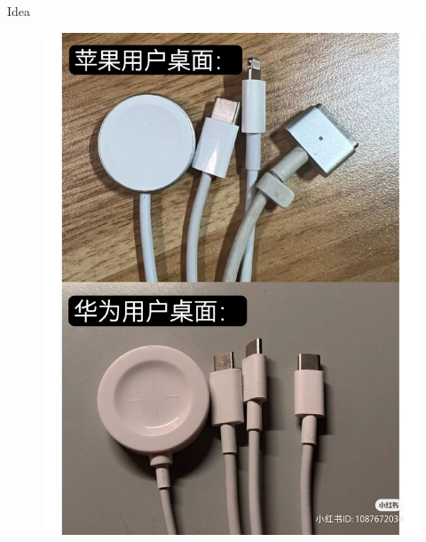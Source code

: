 \begin{frame}{Idea}
    \begin{figure}[h]
        \centering
        \begin{minipage}{0.48\textwidth}
            \centering
            \includegraphics[scale=0.135]{figures/interface1.jpg}
        \end{minipage}
        \begin{minipage}{0.48\textwidth}
            \centering

\end{minipage}
\end{figure}
\end{frame}
